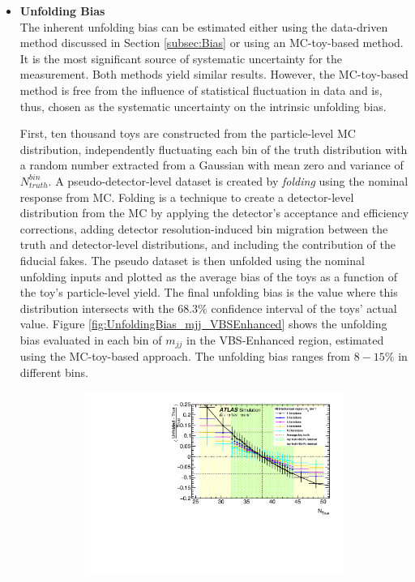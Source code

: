 \begin{itemize}
    \item{\textbf{Unfolding Bias}\\ The inherent unfolding bias can be estimated either using the data-driven method discussed in Section \ref{subsec:Bias} or using an MC-toy-based method. It is the most significant source of systematic uncertainty for the measurement. Both methods yield similar results. However, the MC-toy-based method is free from the influence of statistical fluctuation in data and is, thus, chosen as the systematic uncertainty on the intrinsic unfolding bias. 

    First, ten thousand toys are constructed from the particle-level MC distribution, independently fluctuating each bin of the truth distribution with a random number extracted from a Gaussian with mean zero and variance of $N_{truth}^{bin}$. A pseudo-detector-level dataset is created by \textit{folding} using the nominal response from MC. Folding is a technique to create a detector-level distribution from the MC by applying the detector's acceptance and efficiency corrections, adding detector resolution-induced bin migration between the truth and detector-level distributions, and including the contribution of the fiducial fakes. The pseudo dataset is then unfolded using the nominal unfolding inputs and plotted as the average bias of the toys as a function of the toy's particle-level yield. The final unfolding bias is the value where this distribution intersects with the $68.3\%$ confidence interval of the toys' actual value. Figure \ref{fig:UnfoldingBias_mjj_VBSEnhanced} shows the unfolding bias evaluated in each bin of $m_{jj}$ in the VBS-Enhanced region, estimated using the MC-toy-based approach. The unfolding bias ranges from $8-15\%$ in different bins.
    \begin{figure}[!htbp]
        \centering
        \begin{subfigure}{.49\textwidth}
            \centering
            \includegraphics[width=.9\linewidth]{figures/Analysis/Unfolding/unfoldingbias/unfolding_bias_mjj_VBSEnh_bin1.pdf}

\end{subfigure}
\end{figure}}
\end{itemize}
